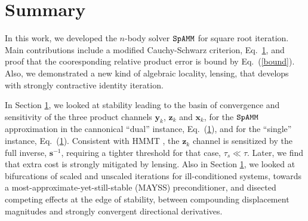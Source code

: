 \documentclass[letterpaper,twocolumn,amsmath,amsfont,amssymb,english,aps,jcp,preprintnumbers,groupaddress,nofootinbib,tightenlines,floatfix]{revtex4}
\newcommand{\mat}[1]{\boldsymbol{#1}}
\theoremstyle{plain}
\theoremstyle{remark}
\theoremstyle{plain}
\begin{document}

\section{Summary}
In this work, we developed the $n$-body solver $\tt SpAMM$ for square root iteration.   
Main contributions include a modified Cauchy-Schwarz criterion, Eq.~\ref{}, and proof that the 
cooresponding relative product error is bound by Eq.~(\ref{bound}).  Also, we demonstrated a new kind of 
algebraic locality, {lensing}, that develops with strongly contractive identity iteration.
 
In Section \ref{}, we looked at stability leading to the basin of convergence and sensitivity of the three
product channels $\mat{y}_k$, $\mat{z}_k$ and $\mat{x}_k$, for the $\tt SpAMM$ approximation in the 
cannonical ``dual'' instance, Eq.~(\ref{}), and for the ``single'' instance, Eq.~(\ref{}).
Consistent with HMMT \cite{}, the $\mat{z}_k$ channel is sensitized by the full inverse,
$\mat{s}^{-1}$, requiring a tighter threshold for that case, $\tau_s \ll \tau$.  Later, we find that 
extra cost is strongly mitigated by lensing.  Also in Section \ref{}, we looked at bifurcations 
of scaled and unscaled iterations for ill-conditioned systems, towards a most-approximate-yet-still-stable (MAYSS) 
preconditioner, and disected competing effects at the edge of stability,  between compounding displacement magnitudes and 
strongly convergent directional derivatives.  
\end{document}
